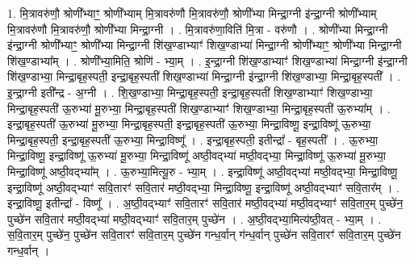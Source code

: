 \documentclass[17pt]{extarticle}
\begin{document}
1. मि॒त्रावरु॑णौ॒ श्रोणी᳚भ्याꣳ॒॒ श्रोणी᳚भ्याम् मि॒त्रावरु॑णौ मि॒त्रावरु॑णौ॒ श्रोणी᳚भ्या मिन्द्रा॒ग्नी इ॑न्द्रा॒ग्नी श्रोणी᳚भ्याम् मि॒त्रावरु॑णौ मि॒त्रावरु॑णौ॒ श्रोणी᳚भ्या मिन्द्रा॒ग्नी । . मि॒त्रावरु॑णा॒विति॑ मि॒त्रा - वरु॑णौ । . श्रोणी᳚भ्या मिन्द्रा॒ग्नी इ॑न्द्रा॒ग्नी श्रोणी᳚भ्याꣳ॒॒ श्रोणी᳚भ्या मिन्द्रा॒ग्नी शि॑ख॒ण्डाभ्याꣳ॑ शिख॒ण्डाभ्या॑ मिन्द्रा॒ग्नी श्रोणी᳚भ्याꣳ॒॒ श्रोणी᳚भ्या मिन्द्रा॒ग्नी शि॑ख॒ण्डाभ्या᳚म् । . श्रोणी᳚भ्या॒मिति॒ श्रोणि॑ - भ्या॒म् । . इ॒न्द्रा॒ग्नी शि॑ख॒ण्डाभ्याꣳ॑ शिख॒ण्डाभ्या॑ मिन्द्रा॒ग्नी इ॑न्द्रा॒ग्नी शि॑ख॒ण्डाभ्या॒ मिन्द्रा॒बृह॒स्पती॒ इन्द्रा॒बृह॒स्पती॑ शिख॒ण्डाभ्या॑ मिन्द्रा॒ग्नी इ॑न्द्रा॒ग्नी शि॑ख॒ण्डाभ्या॒ मिन्द्रा॒बृह॒स्पती᳚ । . इ॒न्द्रा॒ग्नी इती᳚न्द्र - अ॒ग्नी । . शि॒ख॒ण्डाभ्या॒ मिन्द्रा॒बृह॒स्पती॒ इन्द्रा॒बृह॒स्पती॑ शिख॒ण्डाभ्याꣳ॑ शिख॒ण्डाभ्या॒ मिन्द्रा॒बृह॒स्पती॑ ऊ॒रुभ्या॑ मू॒रुभ्या॒ मिन्द्रा॒बृह॒स्पती॑ शिख॒ण्डाभ्याꣳ॑ शिख॒ण्डाभ्या॒ मिन्द्रा॒बृह॒स्पती॑ ऊ॒रुभ्या᳚म् । . इन्द्रा॒बृह॒स्पती॑ ऊ॒रुभ्या॑ मू॒रुभ्या॒ मिन्द्रा॒बृह॒स्पती॒ इन्द्रा॒बृह॒स्पती॑ ऊ॒रुभ्या॒ मिन्द्रा॒विष्णू॒ इन्द्रा॒विष्णू॑ ऊ॒रुभ्या॒ मिन्द्रा॒बृह॒स्पती॒ इन्द्रा॒बृह॒स्पती॑ ऊ॒रुभ्या॒ मिन्द्रा॒विष्णू᳚ । . इन्द्रा॒बृह॒स्पती॒ इतीन्द्रा᳚ - बृह॒स्पती᳚ । . ऊ॒रुभ्या॒ मिन्द्रा॒विष्णू॒ इन्द्रा॒विष्णू॑ ऊ॒रुभ्या॑ मू॒रुभ्या॒ मिन्द्रा॒विष्णू॑ अष्ठी॒वद्भ्या॑ मष्ठी॒वद्भ्या॒ मिन्द्रा॒विष्णू॑ ऊ॒रुभ्या॑ मू॒रुभ्या॒ मिन्द्रा॒विष्णू॑ अष्ठी॒वद्भ्या᳚म् । . ऊ॒रुभ्या॒मित्यू॒रु - भ्या॒म् । . इन्द्रा॒विष्णू॑ अष्ठी॒वद्भ्या॑ मष्ठी॒वद्भ्या॒ मिन्द्रा॒विष्णू॒ इन्द्रा॒विष्णू॑ अष्ठी॒वद्भ्याꣳ॑ सवि॒तारꣳ॑ सवि॒तार॑ मष्ठी॒वद्भ्या॒ मिन्द्रा॒विष्णू॒ इन्द्रा॒विष्णू॑ अष्ठी॒वद्भ्याꣳ॑ सवि॒तार᳚म् । . इन्द्रा॒विष्णू॒ इतीन्द्रा᳚ - विष्णू᳚ । . अ॒ष्ठी॒वद्भ्याꣳ॑ सवि॒तारꣳ॑ सवि॒तार॑ मष्ठी॒वद्भ्या॑ मष्ठी॒वद्भ्याꣳ॑ सवि॒तार॒म् पुच्छे॑न॒ पुच्छे॑न सवि॒तार॑ मष्ठी॒वद्भ्या॑ मष्ठी॒वद्भ्याꣳ॑ सवि॒तार॒म् पुच्छे॑न । . अ॒ष्ठी॒वद्भ्या॒मित्य॑ष्ठी॒वत् - भ्या॒म् । . स॒वि॒तार॒म् पुच्छे॑न॒ पुच्छे॑न सवि॒तारꣳ॑ सवि॒तार॒म् पुच्छे॑न गन्ध॒र्वान् ग॑न्ध॒र्वान् पुच्छे॑न सवि॒तारꣳ॑ सवि॒तार॒म् पुच्छे॑न गन्ध॒र्वान् । \newline
\end{document}
